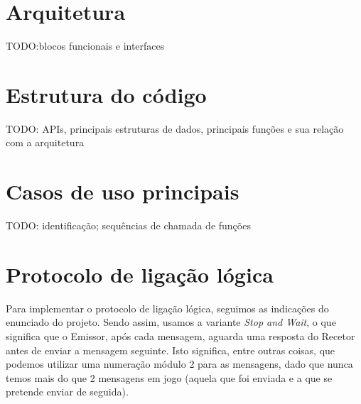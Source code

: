 \documentclass[11pt,a4paper,reqno]{report}
\numberwithin{equation}{section}
\begin{document}
\chapter{Arquitetura}

TODO:blocos funcionais e interfaces


\chapter{Estrutura do código}

TODO: APIs, principais estruturas de dados, principais funções e sua relação com a arquitetura


\chapter{Casos de uso principais}

TODO: identificação; sequências de chamada de funções


\chapter{Protocolo de ligação lógica}

Para implementar o protocolo de ligação lógica, seguimos as indicações do enunciado do projeto. Sendo assim, usamos a variante \emph{Stop and Wait}, o que significa que o Emissor, após cada mensagem, aguarda uma resposta do Recetor antes de enviar a mensagem seguinte. Isto significa, entre outras coisas, que podemos utilizar uma numeração módulo 2 para as mensagens, dado que nunca temos mais do que 2 mensagens em jogo (aquela que foi enviada e a que se pretende enviar de seguida).
\end{document}
